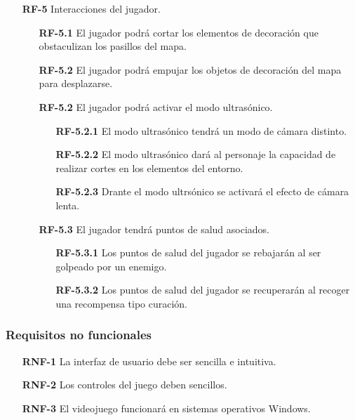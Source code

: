 \begin{enumerate}
    \item[\textbf{RF-5}] Interacciones del jugador.
    \begin{enumerate}
        \item[\textbf{RF-5.1}] El jugador podrá cortar los elementos de decoración que obstaculizan los pasillos del mapa.
        \item[\textbf{RF-5.2}] El jugador podrá empujar los objetos de decoración del mapa para desplazarse. 
        \item[\textbf{RF-5.2}] El jugador podrá activar el modo ultrasónico. 
        \begin{enumerate}
            \item[\textbf{RF-5.2.1}] El modo ultrasónico tendrá un modo de cámara distinto. 
            \item[\textbf{RF-5.2.2}] El modo ultrasónico dará al personaje la capacidad de realizar cortes en los elementos del entorno.
            \item[\textbf{RF-5.2.3}] Drante el modo ultrsónico se activará el efecto de cámara lenta.
        \end{enumerate}
        \item[\textbf{RF-5.3}] El jugador tendrá puntos de salud asociados.
        \begin{enumerate}
            \item[\textbf{RF-5.3.1}] Los puntos de salud del jugador se rebajarán al ser golpeado por un enemigo. 
            \item[\textbf{RF-5.3.2}] Los puntos de salud del jugador se recuperarán al recoger una recompensa tipo curación.
        \end{enumerate}
    \end{enumerate}
\end{enumerate}

\subsubsection{Requisitos no funcionales}

\begin{enumerate}
    \item[\textbf{RNF-1}]  La interfaz de usuario debe ser sencilla e intuitiva.
    \item[\textbf{RNF-2}]  Los controles del juego deben sencillos.
    \item[\textbf{RNF-3}]  El videojuego funcionará en sistemas operativos Windows.
\end{enumerate} 

